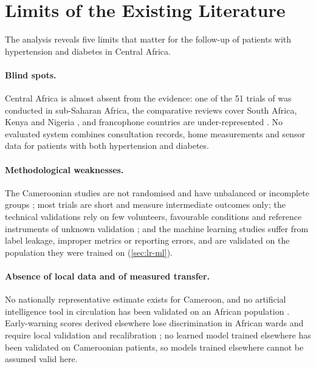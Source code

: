 \section{Limits of the Existing Literature}\label{sec:lit-gaps}\label{sec:positioning}

The analysis reveals five limits that matter for the follow-up of patients with hypertension and diabetes in Central Africa.

\paragraph{Blind spots.} Central Africa is almost absent from the evidence: one of the 51 trials of \textcite{mao2020} was conducted in sub-Saharan Africa, the comparative reviews cover South Africa, Kenya and Nigeria \parencite{agbeyangi2025}, and francophone countries are under-represented \parencite{dodoo2022}. No evaluated system combines consultation records, home measurements and sensor data for patients with both hypertension and diabetes.

\paragraph{Methodological weaknesses.} The Cameroonian studies are not randomised and have unbalanced or incomplete groups \parencite{kingue2013,bediang2021}; most trials are short and measure intermediate outcomes only; the technical validations rely on few volunteers, favourable conditions and reference instruments of unknown validation \parencite{efendi2025}; and the machine learning studies suffer from label leakage, improper metrics or reporting errors, and are validated on the population they were trained on (\cref{sec:lr-ml}).

\paragraph{Absence of local data and of measured transfer.} No nationally representative estimate exists for Cameroon, and no artificial intelligence tool in circulation has been validated on an African population \parencite{segun2025}. Early-warning scores derived elsewhere lose discrimination in African wards and require local validation and recalibration \parencite{moore2017uva,tomas2026ews}; no learned model trained elsewhere has been validated on Cameroonian patients, so models trained elsewhere cannot be assumed valid here.

